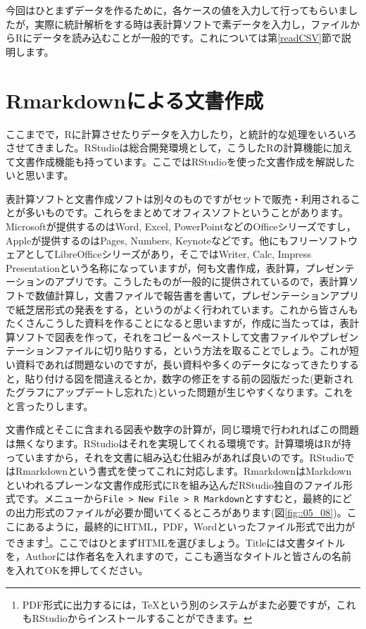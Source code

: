\documentclass{ltjbook}
\begin{document}
今回はひとまずデータを作るために，各ケースの値を入力して行ってもらいましたが，実際に統計解析をする時は表計算ソフトで素データを入力し，ファイルからRにデータを読み込むことが一般的です。これについては第\ref{readCSV}節で説明します。

\section{Rmarkdownによる文書作成}
\label{Rmarkdown}
ここまでで，Rに計算させたりデータを入力したり，と統計的な処理をいろいろさせてきました。RStudioは総合開発環境として，こうしたRの計算機能に加えて文書作成機能も持っています。ここではRStudioを使った文書作成を解説したいと思います。

表計算ソフトと文書作成ソフトは別々のものですがセットで販売・利用されることが多いものです。これらをまとめてオフィスソフトということがあります。Microsoftが提供するのはWord, Excel, PowerPointなどのOfficeシリーズですし，Appleが提供するのはPages, Numbers, Keynoteなどです。他にもフリーソフトウェアとしてLibreOfficeシリーズがあり，そこではWriter, Calc, Impress Presentationという名称になっていますが，何も文書作成，表計算，プレゼンテーションのアプリです。こうしたものが一般的に提供されているので，表計算ソフトで数値計算し，文書ファイルで報告書を書いて，プレゼンテーションアプリで紙芝居形式の発表をする，というのがよく行われています。これから皆さんもたくさんこうした資料を作ることになると思いますが，作成に当たっては，表計算ソフトで図表を作って，それをコピー＆ペーストして文書ファイルやプレゼンテーションファイルに切り貼りする，という方法を取ることでしょう。これが短い資料であれば問題ないのですが，長い資料や多くのデータになってきたりすると，貼り付ける図を間違えるとか，数字の修正をする前の図版だった(更新されたグラフにアップデートし忘れた)といった問題が生じやすくなります。これをと言ったりします。

文書作成とそこに含まれる図表や数字の計算が，同じ環境で行われればこの問題は無くなります。RStudioはそれを実現してくれる環境です。計算環境はRが持っていますから，それを文書に組み込む仕組みがあれば良いのです。RStudioではRmarkdownという書式を使ってこれに対応します。RmarkdownはMarkdownといわれるプレーンな文書作成形式にRを組み込んだRStudio独自のファイル形式です。メニューから\verb|File > New File > R Markdown|とすすむと，最終的にどの出力形式のファイルが必要か聞いてくるところがあります(図\ref{fig::05_08})。ここにあるように，最終的にHTML，PDF，Wordといったファイル形式で出力ができます\footnote{PDF形式に出力するには，TeXという別のシステムがまた必要ですが，これもRStudioからインストールすることができます。}。ここではひとまずHTMLを選びましょう。Titleには文書タイトルを，Authorには作者名を入れますので，ここも適当なタイトルと皆さんの名前を入れてOKを押してください。
\end{document}

